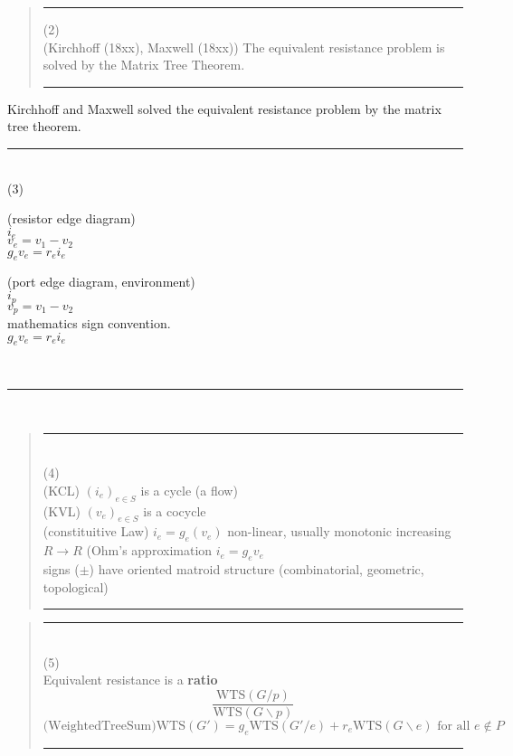 \documentclass{article}
\begin{document}
\pagebreak[3] \begin{quote}\rule{\textwidth}{3pt}
(2)\\
(Kirchhoff (18xx), Maxwell (18xx)) The equivalent resistance problem
is solved by
the Matrix Tree Theorem.
 
\rule{\textwidth}{3pt}
\end{quote}


Kirchhoff and Maxwell solved the equivalent resistance problem
by the matrix tree theorem.


\rule{\textwidth}{3pt}\\
(3)\\
\begin{minipage}{.4\textwidth}
(resistor edge diagram)\\
$i_e$\\
$v_e=v_1-v_2$\\
$g_ev_e=r_ei_e$
\end{minipage}
\begin{minipage}{.4\textwidth}
(port edge diagram, environment)\\
$i_p$\\
$v_p=v_1-v_2$\\
mathematics sign convention.\\
$g_ev_e=r_ei_e$
\end{minipage}\\
\rule{\textwidth}{3pt}\\


\pagebreak[3] \begin{quote}\rule{\textwidth}{3pt}\\
(4)\\
(KCL) $(i_e)_{e\in S}$ is a cycle (a flow)\\
(KVL) $(v_e)_{e\in S}$ is a cocycle\\
(constituitive Law) $i_e=g_e(v_e)$
non-linear, usually monotonic increasing $R\rightarrow R$ 
(Ohm's approximation $i_e=g_ev_e$\\
signs ($\pm$) have oriented matroid structure
(combinatorial, geometric, topological)\\
\rule{\textwidth}{3pt}
\end{quote}

\pagebreak[3] \begin{quote}\rule{\textwidth}{3pt}\\
(5)\\
Equivalent resistance is a \textbf{ratio}
\[
\frac{\mbox{WTS}(G/p)}
{\mbox{WTS}(G\backslash p)}
\]
\[
\mbox{(WeightedTreeSum)}\mbox{WTS}(G') =
g_e \mbox{WTS}(G'/e) + r_e \mbox{WTS} (G \backslash e)
\text{\ for all\ }e \not\in P
\]
\rule{\textwidth}{3pt}
\end{quote}
\end{document}
